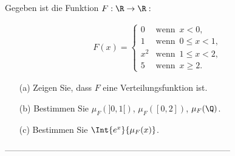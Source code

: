 \begin{exercise}

Gegeben ist die Funktion $F: \R \to \R:$

\begin{align*}
  F(x) =
  \begin{cases}
    0   & \text{wenn} \enspace x < 0, \\
    1   & \text{wenn} \enspace 0 \leq x < 1, \\
    x^2 & \text{wenn} \enspace 1 \leq x < 2, \\
    5   & \text{wenn} \enspace x \geq 2.
  \end{cases}
\end{align*}

\begin{itemize}
  \item[(a)] Zeigen Sie, dass $F$ eine Verteilungsfunktion ist.
  \item[(b)] Bestimmen Sie $\mu_F(]0, 1[)$, $\mu_F([0, 2])$, $\mu_F(\Q)$.
  \item[(c)] Bestimmen Sie $\Int{e^x}{\mu_F(x)}$.
\end{itemize}

\end{exercise}

--------------------------------------------------------------------------------

